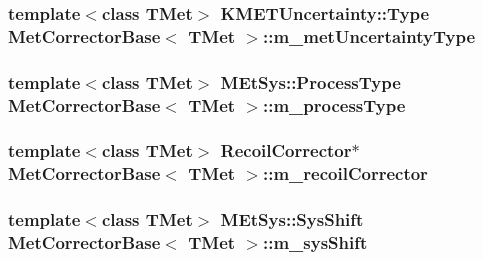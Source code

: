 \label{classMetCorrectorBase_a5ca29fccc54b4183b2cf73a4e0183abe}
\hypertarget{classMetCorrectorBase_ae43982fe34cd695eaa6faca8ebbb75b0}{
\subsubsection[{m\_\-metUncertaintyType}]{\setlength{\rightskip}{0pt plus 5cm}template$<$class TMet$>$ KMETUncertainty::Type {\bf MetCorrectorBase}$<$ TMet $>$::{\bf m\_\-metUncertaintyType}}}
\label{classMetCorrectorBase_ae43982fe34cd695eaa6faca8ebbb75b0}
\hypertarget{classMetCorrectorBase_a2ac16c2b3fcfddb16098eea641d506c3}{
\subsubsection[{m\_\-processType}]{\setlength{\rightskip}{0pt plus 5cm}template$<$class TMet$>$ {\bf MEtSys::ProcessType} {\bf MetCorrectorBase}$<$ TMet $>$::{\bf m\_\-processType}}}
\label{classMetCorrectorBase_a2ac16c2b3fcfddb16098eea641d506c3}
\hypertarget{classMetCorrectorBase_a5b1690be919bde47dcfd8f5d5be781c8}{
\subsubsection[{m\_\-recoilCorrector}]{\setlength{\rightskip}{0pt plus 5cm}template$<$class TMet$>$ {\bf RecoilCorrector}$\ast$ {\bf MetCorrectorBase}$<$ TMet $>$::{\bf m\_\-recoilCorrector}}}
\label{classMetCorrectorBase_a5b1690be919bde47dcfd8f5d5be781c8}
\hypertarget{classMetCorrectorBase_aaf1ddd88ab9c9070e006cf6d69ce1ca6}{
\subsubsection[{m\_\-sysShift}]{\setlength{\rightskip}{0pt plus 5cm}template$<$class TMet$>$ {\bf MEtSys::SysShift} {\bf MetCorrectorBase}$<$ TMet $>$::{\bf m\_\-sysShift}}}
